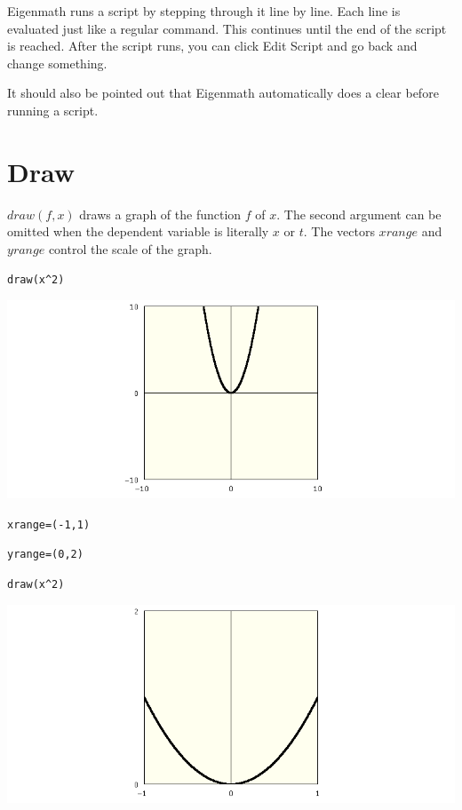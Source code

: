\documentclass[12pt]{book}
\begin{document}
\medskip
\noindent
Eigenmath runs a script by stepping through it line by line.
Each line is evaluated just like a regular command.
This continues until the end of the script is reached.
After the script runs, you can click Edit Script and go back and change something.

\medskip
\noindent
It should also be pointed out that Eigenmath automatically does a clear before
running a script.

\newpage

%

\chapter{Draw}

\newpage

\noindent
$draw(f,x)$ draws a graph of the function $f$ of $x$.
The second argument can be omitted when the dependent variable
is literally $x$ or $t$.
The vectors $xrange$ and $yrange$ control the scale of the graph.

\medskip
\verb$draw(x^2)$

\medskip
\noindent
\includegraphics[scale=0.5]{parabola.png}

\verb$xrange=(-1,1)$

\verb$yrange=(0,2)$

\verb$draw(x^2)$

\medskip
\noindent
\includegraphics[scale=0.5]{parabola2.png}
\end{document}
